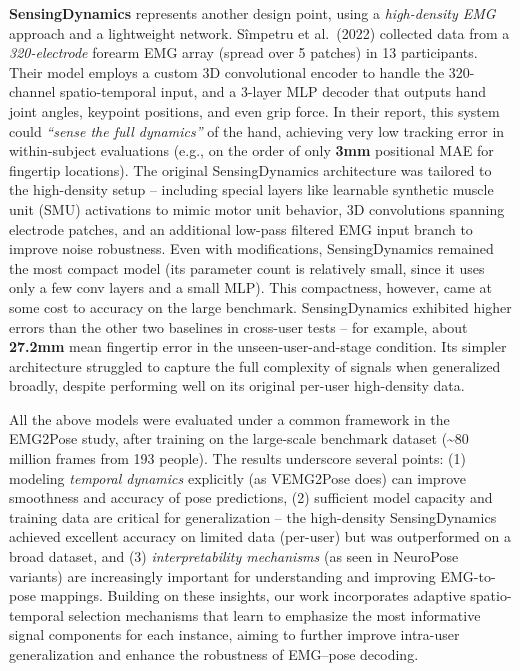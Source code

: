 \textbf{SensingDynamics} represents another design point, using a \textit{high-density EMG} approach and a lightweight network. S\^impetru et al.\ (2022) collected data from a \textit{320-electrode} forearm EMG array (spread over 5 patches) in 13 participants. Their model employs a custom 3D convolutional encoder to handle the 320-channel spatio-temporal input, and a 3-layer MLP decoder that outputs hand joint angles, keypoint positions, and even grip force. In their report, this system could \textit{``sense the full dynamics''} of the hand, achieving very low tracking error in within-subject evaluations (e.g., on the order of only \textbf{3mm} positional MAE for fingertip locations). The original SensingDynamics architecture was tailored to the high-density setup -- including special layers like learnable synthetic muscle unit (SMU) activations to mimic motor unit behavior, 3D convolutions spanning electrode patches, and an additional low-pass filtered EMG input branch to improve noise robustness. Even with modifications, SensingDynamics remained the most compact model (its parameter count is relatively small, since it uses only a few conv layers and a small MLP). This compactness, however, came at some cost to accuracy on the large benchmark. SensingDynamics exhibited higher errors than the other two baselines in cross-user tests -- for example, about \textbf{27.2mm} mean fingertip error in the unseen-user-and-stage condition. Its simpler architecture struggled to capture the full complexity of signals when generalized broadly, despite performing well on its original per-user high-density data.

All the above models were evaluated under a common framework in the EMG2Pose study, after training on the large-scale benchmark dataset (\textasciitilde{}80 million frames from 193 people). The results underscore several points: (1) modeling \textit{temporal dynamics} explicitly (as VEMG2Pose does) can improve smoothness and accuracy of pose predictions, (2) sufficient model capacity and training data are critical for generalization -- the high-density SensingDynamics achieved excellent accuracy on limited data (per-user) but was outperformed on a broad dataset, and (3) \textit{interpretability mechanisms} (as seen in NeuroPose variants) are increasingly important for understanding and improving EMG-to-pose mappings. Building on these insights, our work incorporates adaptive spatio-temporal selection mechanisms that learn to emphasize the most informative signal components for each instance, aiming to further improve intra-user generalization and enhance the robustness of EMG--pose decoding.

